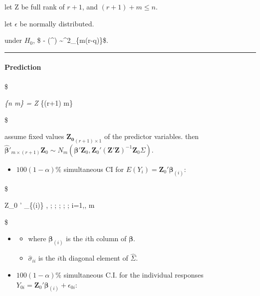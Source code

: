 \documentclass[
]{book}
\providecommand{\tightlist}{%
  \setlength{\itemsep}{0pt}\setlength{\parskip}{0pt}}
\begin{document}
{{let Z be full rank of \(r+1\), and \((r+1) + m \le n\).

let \(\epsilon\) be normally distributed.

under \(H_0\), \$ -  \ln (\Lambda\^{}\ast ) \sim \chi\^{}2\_\{m(r-q)\}\$.

\begin{center}\rule{0.5\linewidth}{0.5pt}\end{center}

\hypertarget{prediction}{%
\paragraph{Prediction}\label{prediction}}

\$

\emph{\{n \times m\} = \pmb Z \hat \beta}\{(r+1) \times m\}

\$

assume fixed values \(\pmb {Z_0}_{(r+1) \times 1}\) of the predictor variables. then \(\hat {\pmb \beta}'_{m \times (r+1)} \pmb Z_0 \sim N_m(\pmb \beta ' \pmb Z_0 , \pmb Z_0 ' (\pmb Z ' \pmb Z)^{-1} \pmb Z_0 \Sigma)\).

\begin{itemize}
\tightlist
\item
  \(100(1-\alpha)\%\) simultaneous CI for \(E(Y_i) = \pmb Z_0 ' \pmb \beta_{(i)}\):
\end{itemize}

\$

\pmb Z\_0 ' \pmb \beta\_\{(i)\} \pm {} , ; ; ; ; ; i=1,\cdots, m

\$

\begin{itemize}
\item
  \begin{itemize}
  \tightlist
  \item
    where \(\pmb \beta_{(i)}\) is the \(i\)th column of \(\pmb \beta\).
  \item
    \(\hat \sigma_{ii}\) is the \(i\)th diagonal element of \(\hat \Sigma\).
  \end{itemize}
\end{itemize}

\begin{itemize}
\tightlist
\item
  \(100(1-\alpha)\%\) simultaneous C.I. for the individual responses \(Y_{0i} = \pmb Z_0 ' \pmb \beta_{(i)} + \epsilon_{0i}\):
\end{itemize}

}}
\end{document}
